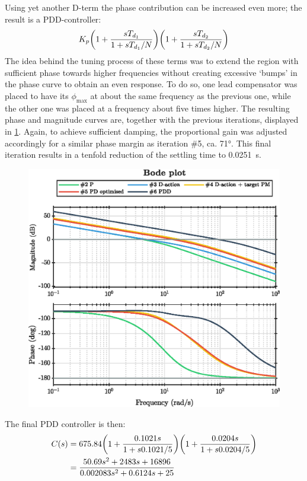 Using yet another D-term the phase contribution can be increased even more; the result is a PDD-controller:
\begin{equation}
K_p \qty(1 + \frac{sT_{d_1}}{1 + sT_{d_1}/N})\qty(1 + \frac{sT_{d_2}}{1 + sT_{d_2}/N})
\label{eq:pdd}
\end{equation}
The idea behind the tuning process of these terms was to extend the region with sufficient phase towards higher frequencies without creating excessive `bumps' in the phase curve to obtain an even response. To do so, one lead compensator was placed to have its $\phi_\text{max}$ at about the same frequency as the previous one, while the other one was placed at a frequency about five times higher. The resulting phase and magnitude curves are, together with the previous iterations, displayed in \cref{fig:cont_controllers_bode}. Again, to achieve sufficient damping, the proportional gain was adjusted accordingly for a similar phase margin as iteration \#5, ca. \ang{71}. This final iteration results in a tenfold reduction of the settling time to \SI{0.0251}{\second}.
\begin{figure}[ht]
    \centering
    \includegraphics[]{media/q1/pd_controllers_bode.eps}
    \caption{}
    \label{fig:cont_controllers_bode}
\end{figure}
The final PDD controller is then:
$$ 
\begin{aligned}
C(s) &= 675.84\qty(1 + \frac{0.1021s}{1 + s0.1021/5})
            \qty(1 + \frac{0.0204s}{1 + s0.0204/5})\\
     &= \frac{50.69 s^2 + 2483 s + 16896}{0.002083 s^2 + 0.6124 s + 25}
\end{aligned}
$$
